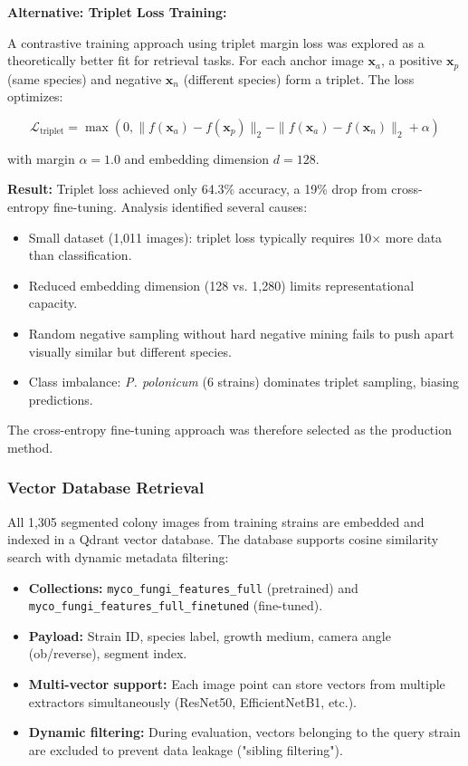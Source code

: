 \textbf{Alternative: Triplet Loss Training:}

A contrastive training approach using triplet margin loss was explored as a theoretically better fit for retrieval tasks. For each anchor image \(\mathbf{x}_a\), a positive \(\mathbf{x}_p\) (same species) and negative \(\mathbf{x}_n\) (different species) form a triplet. The loss optimizes:

\[ \mathcal{L}_{\text{triplet}} = \max\left(0, \| f(\mathbf{x}_a) - f(\mathbf{x}_p) \|_2 - \| f(\mathbf{x}_a) - f(\mathbf{x}_n) \|_2 + \alpha \right) \]

with margin \(\alpha = 1.0\) and embedding dimension \(d = 128\).

\textbf{Result:} Triplet loss achieved only 64.3\% accuracy, a 19\% drop from cross-entropy fine-tuning. Analysis identified several causes:

\begin{itemize}
\item Small dataset (1,011 images): triplet loss typically requires 10\(\times\) more data than classification.
\item Reduced embedding dimension (128 vs. 1,280) limits representational capacity.
\item Random negative sampling without hard negative mining fails to push apart visually similar but different species.
\item Class imbalance: \textit{P. polonicum} (6 strains) dominates triplet sampling, biasing predictions.
\end{itemize}

The cross-entropy fine-tuning approach was therefore selected as the production method.

\subsubsection{Vector Database Retrieval}\label{vector-database-retrieval}

All 1,305 segmented colony images from training strains are embedded and indexed in a Qdrant vector database. The database supports cosine similarity search with dynamic metadata filtering:

\begin{itemize}
\item \textbf{Collections:} \texttt{myco\_fungi\_features\_full} (pretrained) and \texttt{myco\_fungi\_features\_full\_finetuned} (fine-tuned).
\item \textbf{Payload:} Strain ID, species label, growth medium, camera angle (ob/reverse), segment index.
\item \textbf{Multi-vector support:} Each image point can store vectors from multiple extractors simultaneously (ResNet50, EfficientNetB1, etc.).
\item \textbf{Dynamic filtering:} During evaluation, vectors belonging to the query strain are excluded to prevent data leakage ("sibling filtering").
\end{itemize}


